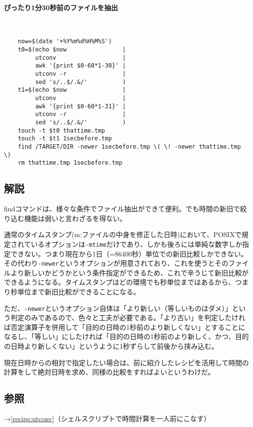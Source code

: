 \paragraph{ぴったり1分30秒前のファイルを抽出}　\\
\begin{frameboxit}{160.0mm}
\begin{verbatim}
	now=$(date '+%Y%m%d%H%M%S')
	t0=$(echo $now                |
	     utconv                   |
	     awk '{print $0-60*1-30}' |
	     utconv -r                |
	     sed 's/..$/.&/'          )
	t1=$(echo $now                |
	     utconv                   |
	     awk '{print $0-60*1-31}' |
	     utconv -r                |
	     sed 's/..$/.&/'          )
	touch -t $t0 thattime.tmp
	touch -t $t1 1secbefore.tmp
	find /TARGET/DIR -newer 1secbefore.tmp \( \! -newer thattime.tmp \)
	rm thattime.tmp 1secbefore.tmp
\end{verbatim}
\end{frameboxit}

\subsection*{解説}

findコマンドは、様々な条件でファイル抽出ができて便利。でも時間の新旧で絞り込む機能は弱いと言わざるを得ない。

通常のタイムスタンプ(m:ファイルの中身を修正した日時)において、POSIXで規定されているオプションは\verb|-mtime|だけであり、しかも後ろには単純な数字しか指定できない。つまり現在から1日（=86400秒）単位での新旧比較しかできない。その代わり\verb|-newer|というオプションが用意されており、これを使うとそのファイルより新しいかどうかという条件指定ができるため、これで辛うじて新旧比較ができるようになる。タイムスタンプはどの環境でも秒単位まではあるから、つまり秒単位まで新旧比較ができることになる。

ただ、\verb|-newer|というオプション自体は「より新しい（等しいものはダメ）」という判定のみであるので、色々と工夫が必要である。「より古い」を判定したければ否定演算子を併用して「目的の日時の1秒前のより新しくない」とすることになるし、「等しい」にしたければ「目的の日時の1秒前のより新しく、かつ、目的の日時より新しくない」というように1秒ずらして前後から挟み込む。

現在日時からの相対で指定したい場合は、前に紹介したレシピを活用して時間の計算をして絶対日時を求め、同様の比較をすればよいというわけだ。

\subsection*{参照}

\noindent
→\ref{recipe:utconv}（シェルスクリプトで時間計算を一人前にこなす）
